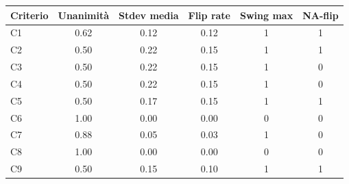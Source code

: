 \begin{tabularx}{\textwidth}{l S[table-format=1.2] S[table-format=1.2] S[table-format=1.2] S[table-format=1.0] S[table-format=2.0]}
  \toprule
  Criterio & {Unanimità} & {Stdev media} & {Flip rate} & {Swing max} & {NA-flip} \\
  \midrule
  C1 & 0.62 & 0.12 & 0.12 & 1 & 1 \\
  C2 & 0.50 & 0.22 & 0.15 & 1 & 1 \\
  C3 & 0.50 & 0.22 & 0.15 & 1 & 0 \\
  C4 & 0.50 & 0.22 & 0.15 & 1 & 0 \\
  C5 & 0.50 & 0.17 & 0.15 & 1 & 1 \\
  C6 & 1.00 & 0.00 & 0.00 & 0 & 0 \\
  C7 & 0.88 & 0.05 & 0.03 & 1 & 0 \\
  C8 & 1.00 & 0.00 & 0.00 & 0 & 0 \\
  C9 & 0.50 & 0.15 & 0.10 & 1 & 1 \\
  \bottomrule
\end{tabularx}
